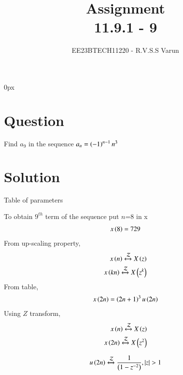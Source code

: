 \documentclass[beamer]{IEEEtran}
\theoremstyle{remark}
\begin{document}
\parindent 0px


\title{Assignment\\[1ex]11.9.1 - 9}
\author{EE23BTECH11220 - R.V.S.S Varun$^{}$%
}
\maketitle
\newpage
\bigskip

\renewcommand{\thefigure}{\theenumi}
\renewcommand{\thetable}{\theenumi}
\section*{Question}
Find $a_{9}$ in the sequence $a_{n}=\left(-1\right)^{n-1}n^{3}$ 
\section*{Solution}
 
\begin{table}[h]
    \centering
   
    
    \caption{Table of parameters}
    \label{tab:11.9.1.9.1}
\end{table}


To obtain $9^{th}$ term of the sequence put $n$=8 in x
\begin{align}
x\left(8\right)=729
\end{align}
From up-scaling property,
\begin{align}
x\left(n\right)\xleftrightarrow{\mathcal{Z}} X\left(z\right) \\
x\left(kn\right)\xleftrightarrow{\mathcal{Z}} X\left(z^k\right)
\end{align}
From table,
\begin{align}
	x\left(2n\right)=\left(2n+1\right)^{3}u\left(2n\right)
\end{align}
Using  $Z$ transform,
\begin{align}
	x\left(n\right)\xleftrightarrow{\mathcal{Z}}X\left(z\right)\\
	x\left(2n\right)\xleftrightarrow{\mathcal{Z}}X\left(z^2\right)
\end{align}


\begin{align}
	u\left(2n\right)\xleftrightarrow{\mathcal{Z}}\frac{1}{\left(1-z^{-2}\right)},\left\vert z\right\vert>1 
\end{align}
\end{document}
